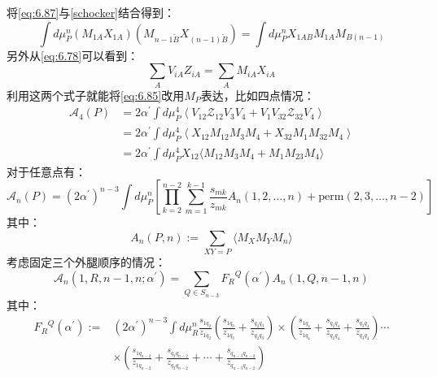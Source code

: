 将\ref{eq:6.87}与\ref{schocker}结合得到：
\begin{equation}
	\int d\mu_P^n(M_{1A}X_{1A})(M_{n-1\tilde{B}}X_{(n-1)\tilde{B}})=\int d\mu_P^nX_{1AB}M_{1A}M_{B(n-1)}
\end{equation}
另外从\ref{eq:6.78}可以看到：
\begin{equation}
	\sum_AV_{iA}Z_{iA}=\sum_AM_{iA}X_{iA}
\end{equation}
利用这两个式子就能将\ref{eq:6.85}改用$M_P$表达，比如四点情况：
\begin{equation}
\begin{aligned}
		\mathcal{A}_4(P)&=2\alpha^{\prime}\int d\mu_P^4\left\langle V_{12}\mathcal{Z}_{12}V_3V_4+V_1V_{32}\mathcal{Z}_{32}V_4\right\rangle\\
	&=2\alpha^{\prime}\int d\mu_{P}^{4}\left\langle X_{12}M_{12}M_{3}M_{4}+X_{32}M_{1}M_{32}M_{4}\right\rangle\\
	&=2\alpha^{\prime}\int d\mu_P^4X_{12}\langle M_{12}M_3M_4+M_1M_{23}M_4\rangle
\end{aligned}
\end{equation}
对于任意点有：
\begin{equation}
\boxed{
		\mathcal{A}_n(P)=(2\alpha^{\prime})^{n-3}\int d\mu_P^n\left[\prod_{k=2}^{n-2}\sum_{m=1}^{k-1}\frac{s_{mk}}{z_{mk}}A_n(1,2,\ldots,n)+\mathrm{perm}(2,3,\ldots,n-2)\right]
}
\end{equation}
其中：
\begin{equation}
	\label{eq:6.96}
\boxed{
		A_n(P,n):=\sum_{XY=P}\langle M_XM_YM_n\rangle
}
\end{equation}
考虑固定三个外腿顺序的情况：
\begin{equation}
	\mathcal{A}_n(1,R,n-1,n;\alpha^{\prime})=\sum_{{Q}\in S_{n-3}}{{F}_R}^{Q}(\alpha^{\prime})A_n(1,{Q},n-1,n)
\end{equation}
其中：
\begin{equation}
\begin{aligned}
	\label{eq:6.98}
		{F_R}^Q(\alpha^{\prime}):=&(2\alpha^{\prime})^{n-3}\int d\mu_R^n\frac{s_{1q_2}}{z_{1q_2}}\left(\frac{s_{1q_3}}{z_{1q_3}}+\frac{s_{q_2q_3}}{z_{q_2q_3}}\right)
	\times\left(\frac{s_{1q_4}}{z_{1q_4}}+\frac{s_{q_2q_4}}{z_{q_2q_4}}+\frac{s_{q_3q_4}}{z_{q_3q_4}}\right)\cdots\\
	&\times\left(\frac{s_{1q_{n-2}}}{z_{1q_{n-2}}}+\frac{s_{q_2q_{n-2}}}{z_{q_2q_{n-2}}}+\cdots+\frac{s_{q_{n-3}q_{n-2}}}{z_{q_{n-3}q_{n-2}}}\right)
\end{aligned}
\end{equation}
